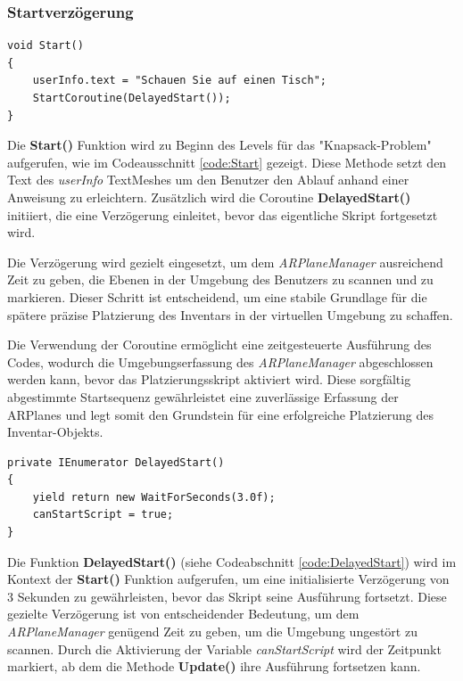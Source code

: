 \subsubsection{Startverzögerung}
\begin{lstlisting}[style=csharp, caption={Beginn des Inventory Placement Controllers}, label=code:Start]
void Start()
{
    userInfo.text = "Schauen Sie auf einen Tisch";
    StartCoroutine(DelayedStart());
}
\end{lstlisting}
Die \textbf{Start()} Funktion wird zu Beginn des Levels für das "Knapsack-Problem" aufgerufen, wie im Codeausschnitt
\ref{code:Start} gezeigt. Diese Methode setzt den Text des \textit{userInfo} TextMeshes um den Benutzer den Ablauf anhand
einer Anweisung zu erleichtern. Zusätzlich wird die Coroutine \textbf{DelayedStart()} initiiert, die eine Verzögerung
einleitet, bevor das eigentliche Skript fortgesetzt wird.

Die Verzögerung wird gezielt eingesetzt, um dem \textit{ARPlaneManager} ausreichend Zeit zu geben, die Ebenen in der
Umgebung des Benutzers zu scannen und zu markieren. Dieser Schritt ist entscheidend, um eine stabile Grundlage für die
spätere präzise Platzierung des Inventars in der virtuellen Umgebung zu schaffen.

Die Verwendung der Coroutine ermöglicht eine zeitgesteuerte Ausführung des Codes, wodurch die Umgebungserfassung des
\textit{ARPlaneManager} abgeschlossen werden kann, bevor das Platzierungsskript aktiviert wird. Diese sorgfältig abgestimmte
Startsequenz gewährleistet eine zuverlässige Erfassung der ARPlanes und legt somit den Grundstein für eine erfolgreiche
Platzierung des Inventar-Objekts.\\

\begin{lstlisting}[style=csharp, caption={Verzoegerter Start}, label=code:DelayedStart]
private IEnumerator DelayedStart()
{
    yield return new WaitForSeconds(3.0f);
    canStartScript = true;
}
\end{lstlisting}
Die Funktion \textbf{DelayedStart()} (siehe Codeabschnitt \ref{code:DelayedStart}) wird im Kontext der \textbf{Start()}
Funktion aufgerufen, um eine initialisierte Verzögerung von 3 Sekunden zu gewährleisten, bevor das Skript seine Ausführung
fortsetzt. Diese gezielte Verzögerung ist von entscheidender Bedeutung, um dem \textit{ARPlaneManager} genügend Zeit zu
geben, um die Umgebung ungestört zu scannen. Durch die Aktivierung der Variable \textit{canStartScript} wird der Zeitpunkt
markiert, ab dem die Methode \textbf{Update()} ihre Ausführung fortsetzen kann.

